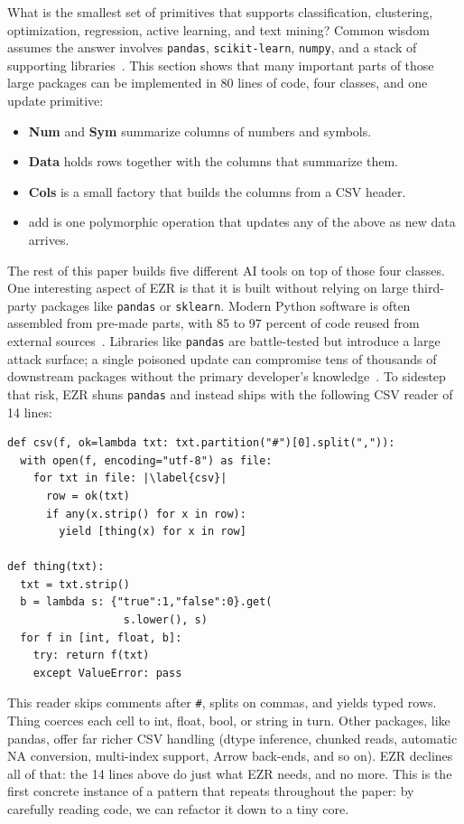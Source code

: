 \documentclass[AMA,STIX2COL]{WileyNJDv5}
\newcommand{\IT}{{\sffamily EZR}}
\newcommand{\cls}[1]{%
  \setlength{\fboxsep}{1.5pt}%
  \colorbox{clsbg}{\sffamily\bfseries{#1}}%
}
\begin{document}
What is the smallest set of primitives that supports
classification, clustering, optimization, regression, active
learning, and text mining? Common wisdom assumes the answer
involves \texttt{pandas}, \texttt{scikit-learn}, \texttt{numpy},
and a stack of supporting libraries~\cite{martinez2021}. This
section shows that many important parts
of those large packages can be implemented in 
80 lines of code, four classes, and one update
primitive:
\begin{itemize}
\item \cls{Num} and \cls{Sym} summarize columns of numbers and
symbols.
\item \cls{Data} holds rows together with the columns that
summarize them.
\item \cls{Cols} is a small factory that builds the columns
from a CSV header.
\item \textsf{add} is one polymorphic operation that updates any
of the above as new data arrives.
\end{itemize}
The rest of this paper builds five different AI tools on top of
those four classes. One interesting
aspect of EZR is that it is built without relying on
large third-party packages like
 \texttt{pandas} or  \texttt{sklearn}.   Modern Python software
is often assembled from pre-made parts, with 85 to 97 percent
of code reused from external sources~\cite{martinez2021}.
Libraries like \texttt{pandas} are battle-tested but introduce
a large attack surface; a single poisoned update can compromise
tens of thousands of downstream packages without the primary
developer's knowledge~\cite{martinez2021}. To sidestep that
risk, \IT{} shuns \texttt{pandas} and instead ships with the
following CSV reader of 14 lines:
\begin{verbatim}
def csv(f, ok=lambda txt: txt.partition("#")[0].split(",")):
  with open(f, encoding="utf-8") as file:
    for txt in file: |\label{csv}|
      row = ok(txt)
      if any(x.strip() for x in row):
        yield [thing(x) for x in row]

def thing(txt):
  txt = txt.strip()
  b = lambda s: {"true":1,"false":0}.get(
                  s.lower(), s)
  for f in [int, float, b]:
    try: return f(txt)
    except ValueError: pass
\end{verbatim}
This reader skips comments after \texttt{\#}, splits on commas,
and yields typed rows. \textsf{Thing} coerces each cell to int,
float, bool, or string in turn. 
Other packages, like \textsf{pandas}, offer far richer CSV
handling (dtype inference, chunked reads, automatic NA
conversion, multi-index support, Arrow back-ends, and so on).
\IT{} declines all of that: the 14 lines above do just what
\IT{} needs, and no more. This is the first
concrete instance of a pattern that repeats throughout the paper:
by carefully reading code, we can refactor it down to a tiny core.
\end{document}
